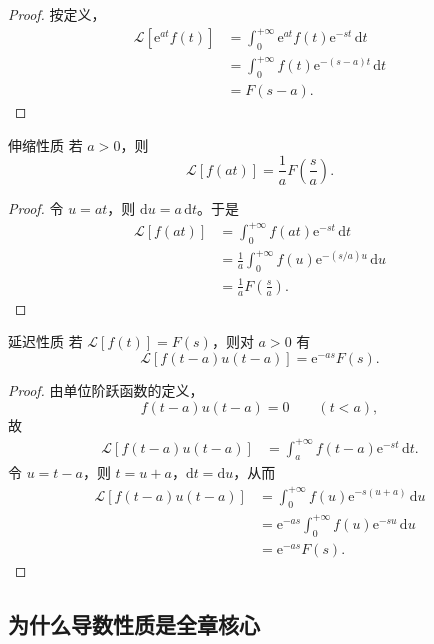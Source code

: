 \begin{proof}
按定义，
\begin{align}
    \mathcal{L}[\mathrm{e}^{at}f(t)]
    &=
    \int_0^{+\infty} \mathrm{e}^{at}f(t)\mathrm{e}^{-st}\,\mathrm{d}t \\
    &=
    \int_0^{+\infty} f(t)\mathrm{e}^{-(s-a)t}\,\mathrm{d}t \\
    &=
    F(s-a).
\end{align}
\end{proof}

\begin{dingli}{伸缩性质}{}
若 $a>0$，则
\[
    \mathcal{L}[f(at)]
    =
    \frac{1}{a}F\left(\frac{s}{a}\right).
\]
\end{dingli}

\begin{proof}
令 $u=at$，则 $\mathrm{d}u=a\,\mathrm{d}t$。于是
\begin{align}
    \mathcal{L}[f(at)]
    &=
    \int_0^{+\infty} f(at)\mathrm{e}^{-st}\,\mathrm{d}t \\
    &=
    \frac{1}{a}\int_0^{+\infty} f(u)\mathrm{e}^{-(s/a)u}\,\mathrm{d}u \\
    &=
    \frac{1}{a}F\left(\frac{s}{a}\right).
\end{align}
\end{proof}

\begin{dingli}{延迟性质}{}
若 $\mathcal{L}[f(t)]=F(s)$，则对 $a>0$ 有
\[
    \mathcal{L}[f(t-a)u(t-a)]
    =
    \mathrm{e}^{-as}F(s).
\]
\end{dingli}

\begin{proof}
由单位阶跃函数的定义，
\[
    f(t-a)u(t-a)=0
    \qquad (t<a),
\]
故
\begin{align}
    \mathcal{L}[f(t-a)u(t-a)]
    &=
    \int_a^{+\infty} f(t-a)\mathrm{e}^{-st}\,\mathrm{d}t.
\end{align}
令 $u=t-a$，则 $t=u+a$，$\mathrm{d}t=\mathrm{d}u$，从而
\begin{align}
    \mathcal{L}[f(t-a)u(t-a)]
    &=
    \int_0^{+\infty} f(u)\mathrm{e}^{-s(u+a)}\,\mathrm{d}u \\
    &=
    \mathrm{e}^{-as}\int_0^{+\infty} f(u)\mathrm{e}^{-su}\,\mathrm{d}u \\
    &=
    \mathrm{e}^{-as}F(s).
\end{align}
\end{proof}

\subsection{为什么导数性质是全章核心}

